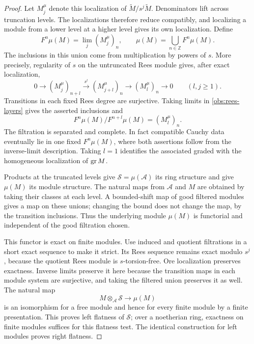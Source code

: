 \begin{proof}
Let $M_j^\mu$ denote this localization of
$\widetilde M/s^j\widetilde M$.  Denominators lift across truncation
levels.  The localizations therefore reduce compatibly, and localizing
a module from a lower level at a higher level gives its own
localization.  Define
\begin{equation}
\label{obs:mu-definition}
 F^n\mu(M)=\lim_j(M_j^\mu)_n,
 \qquad
 \mu(M)=\bigcup_{n\in\mathbb Z}F^n\mu(M).
\end{equation}
The inclusions in this union come from multiplication by powers of $s$.
More precisely, regularity of $s$ on the untruncated Rees module gives,
after exact localization,
\begin{equation}
\label{obs:rees-layers}
 0\longrightarrow(M_j^\mu)_{n+l}
 \xrightarrow{\ s^l\ }(M_{j+l}^\mu)_n
 \longrightarrow(M_l^\mu)_n\longrightarrow0
 \qquad(l,j\geq1).
\end{equation}
Transitions in each fixed Rees degree are surjective.  Taking limits
in \eqref{obs:rees-layers} gives the asserted inclusions and
\[
 F^n\mu(M)/F^{n+l}\mu(M)=(M_l^\mu)_n.
\]
The filtration is separated and complete.  In fact compatible Cauchy
data eventually lie in one fixed $F^n\mu(M)$, where both assertions
follow from the inverse-limit description.  Taking $l=1$ identifies
the associated graded with the homogeneous localization of $\operatorname{gr} M$.

Products at the truncated levels give
$\mathcal S=\mu(\mathcal A)$ its ring structure and give $\mu(M)$
its module structure.  The natural maps from $\mathcal A$ and $M$
are obtained by taking their classes at each level.  A bounded-shift
map of good filtered modules gives a map on these unions; changing
the bound does not change the map, by the transition inclusions.
Thus the underlying module $\mu(M)$ is functorial and independent
of the good filtration chosen.

This functor is exact on finite modules.  Use induced and quotient
filtrations in a short exact sequence to make it strict.  Its Rees
sequence remains exact modulo $s^j$, because the quotient Rees module
is $s$-torsion-free.  Ore localization preserves exactness.  Inverse
limits preserve it here because the transition maps in each module
system are surjective, and taking the filtered union preserves it as
well.  The natural map
\[
 M\otimes_{\mathcal A}\mathcal S\longrightarrow\mu(M)
\]
is an isomorphism for a free module and hence for every finite module
by a finite presentation.  This proves left flatness of $\mathcal S$;
over a noetherian ring, exactness on finite modules suffices for this
flatness test.  The identical construction for left modules proves
right flatness.
\end{proof}

